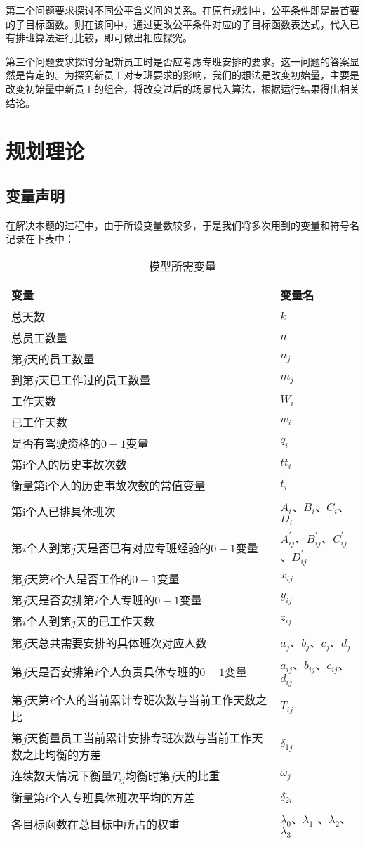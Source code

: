 \documentclass{article}
\begin{document}
	第二个问题要求探讨不同公平含义间的关系。在原有规划中，公平条件即是最首要的子目标函数。则在该问中，通过更改公平条件对应的子目标函数表达式，代入已有排班算法进行比较，即可做出相应探究。
	
	第三个问题要求探讨分配新员工时是否应考虑专班安排的要求。这一问题的答案显然是肯定的。为探究新员工对专班要求的影响，我们的想法是改变初始量，主要是改变初始量中新员工的组合，将改变过后的场景代入算法，根据运行结果得出相关结论。
	\newpage
	\section{规划理论}
	\subsection{变量声明}
	在解决本题的过程中，由于所设变量数较多，于是我们将多次用到的变量和符号名记录在下表中：
	\begin{table}[h]
		\centering
		\caption{模型所需变量}
		\begin{tabular}{|l|l|}
			\hline
			变量 & 变量名 \\
			\hline
			总天数&$k$\\
			总员工数量& $n$\\
			第$j$天的员工数量&   $n_j$  \\
			到第$j$天已工作过的员工数量&$m_{j}$\\
			工作天数&     $W_i$\\
			已工作天数&   $w_i$ \\
			是否有驾驶资格的$0-1$变量&   $q_i$ \\
			第i个人的历史事故次数&   $tt_i$ \\
			衡量第i个人的历史事故次数的常值变量&$t_i$\\
			第i个人已排具体班次&    $A_i$、$B_i$、$C_i$、$D_i$\\
			第$i$个人到第$j$天是否已有对应专班经验的$0-1$变量 &$A_{ij}^{'}$、$B_{ij}^{'}$、$C_{ij}^{'}$、$D_{ij}^{'}$ \\
			第$j$天第$i$个人是否工作的$0-1$变量& $x_{ij}$\\
			第$j$天是否安排第$i$个人专班的$0-1$变量&   $y_{ij}$ \\
			第$i$个人到第$j$天的已工作天数&$z_{ij}$\\
			第$j$天总共需要安排的具体班次对应人数&$a_j$、$b_j$、$c_j$、$d_j$\\
			第$j$天是否安排第$i$个人负责具体专班的$0-1$变量&   $a_{ij}$、$b_{ij}$、$c_{ij}$、$d_{ij}$ \\
			第$j$天第$i$个人的当前累计专班次数与当前工作天数之比&$T_{ij}$\\
			第$j$天衡量员工当前累计安排专班次数与当前工作天数之比均衡的方差 &$\delta_{1j}$\\
			连续数天情况下衡量$T_{ij}$均衡时第$j$天的比重 &$\omega_{j}$\\
			衡量第$i$个人专班具体班次平均的方差 &$\delta_{2i}$\\
			各目标函数在总目标中所占的权重 &$\lambda_{0}$、$\lambda_{1}$ 、$\lambda_{2}$、$\lambda_{3}$\\
			\hline
		\end{tabular}
	\end{table}
	
\end{document}
